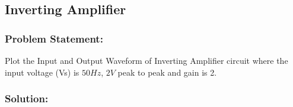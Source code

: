





\pagebreak
\subsection{Inverting Amplifier}
\subsubsection{Problem Statement:}
Plot the Input and Output Waveform of Inverting Amplifier circuit where the input voltage (Vs) is $50Hz$, $2V$ peak to peak and gain is 2.
\subsubsection{Solution:}


